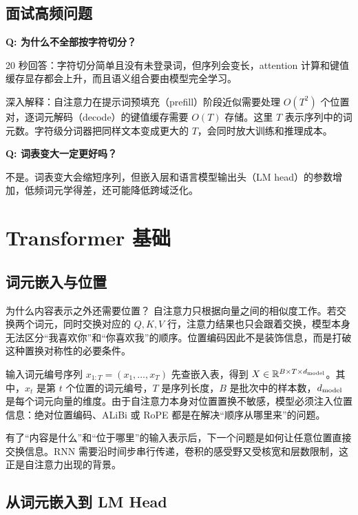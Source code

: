 \section*{面试高频问题}

\textbf{Q: 为什么不全部按字符切分？}

20 秒回答：字符切分简单且没有未登录词，但序列会变长，attention 计算和键值缓存显存都会上升，而且语义组合要由模型完全学习。

深入解释：自注意力在提示词预填充（prefill）阶段近似需要处理 $O(T^2)$ 个位置对，逐词元解码（decode）的键值缓存需要 $O(T)$ 存储。这里 $T$ 表示序列中的词元数。字符级分词器把同样文本变成更大的 $T$，会同时放大训练和推理成本。

\textbf{Q: 词表变大一定更好吗？}

不是。词表变大会缩短序列，但嵌入层和语言模型输出头（LM head）的参数增加，低频词元学得差，还可能降低跨域泛化。

\chapter{Transformer 基础}

\figTransformerOverview

\section{词元嵌入与位置}
\label{sec:embedding-lmhead}

\begin{motivationbox}{为什么内容表示之外还需要位置？}
自注意力只根据向量之间的相似度工作。若交换两个词元，同时交换对应的 $Q,K,V$ 行，注意力结果也只会跟着交换，模型本身无法区分“我喜欢你”和“你喜欢我”的顺序。位置编码因此不是装饰信息，而是打破这种置换对称性的必要条件。
\end{motivationbox}

输入词元编号序列 $x_{1:T}=(x_1,\ldots,x_T)$ 先查嵌入表，得到 $X\in\mathbb R^{B\times T\times d_{\rm model}}$。其中，$x_t$ 是第 $t$ 个位置的词元编号，$T$ 是序列长度，$B$ 是批次中的样本数，$d_{\rm model}$ 是每个词元向量的维度。由于自注意力本身对位置置换不敏感，模型必须注入位置信息：绝对位置编码、ALiBi 或 RoPE 都是在解决“顺序从哪里来”的问题。

有了“内容是什么”和“位于哪里”的输入表示后，下一个问题是如何让任意位置直接交换信息。RNN 需要沿时间步串行传递，卷积的感受野又受核宽和层数限制，这正是自注意力出现的背景。

\section{从词元嵌入到 LM Head}

